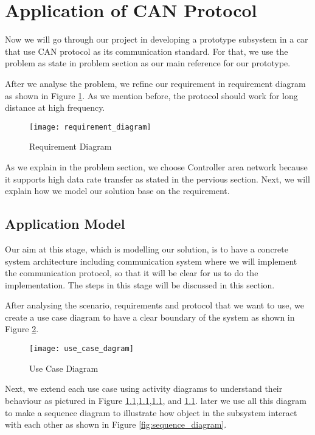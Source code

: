 
\section{Application of CAN Protocol}

Now we will go through our project in  developing a prototype subsystem in a car that use CAN protocol as its communication standard.  For that, we use the problem as state in problem section as our main  reference for our prototype.

After we analyse the problem, we refine our requirement in requirement diagram as shown in Figure \ref{fig:requirement_diagram}. As we mention before, the protocol should work for long distance at high frequency. 

\begin{figure}[h]
    \centering
    \texttt{[image: requirement\_diagram]}
    \caption{Requirement Diagram}
    \label{fig:requirement_diagram}
\end{figure}

As we explain in the problem section, we choose Controller area network because it supports high data rate transfer as stated in the pervious section. Next, we will explain how we model our solution base on the requirement.

\subsection{Application Model}

Our aim at this stage, which is modelling our solution, is to have a concrete system architecture including communication system where we will implement the communication protocol, so that it will be clear for us to do the implementation. The steps in this stage will be discussed in this section.

After analysing the scenario, requirements and protocol that we want to use, we create a use case diagram to have a clear boundary of the system as shown in Figure \ref{fig:use_case_dagram}.

\begin{figure}[h]
    \centering
    \texttt{[image: use\_case\_dagram]}
    \caption{Use Case Diagram}
    \label{fig:use_case_dagram}
\end{figure}

Next, we extend each use case using activity diagrams to understand their behaviour as pictured in Figure \ref{},\ref{},\ref{}, and \ref{}. later we use all this diagram to make a sequence diagram to illustrate how object in the subsystem interact with each other as shown in Figure \ref{fig:sequence_diagram}.

